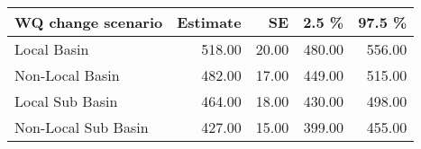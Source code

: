 \begin{table}[ht]
\centering
\begin{tabular}{lrrrr}
  \hline
WQ change scenario & Estimate & SE & 2.5 \% & 97.5 \% \\ 
  \hline
Local Basin & 518.00 & 20.00 & 480.00 & 556.00 \\ 
  Non-Local Basin & 482.00 & 17.00 & 449.00 & 515.00 \\ 
  Local Sub Basin & 464.00 & 18.00 & 430.00 & 498.00 \\ 
  Non-Local  Sub Basin & 427.00 & 15.00 & 399.00 & 455.00 \\ 
   \hline
\end{tabular}
\end{table}
